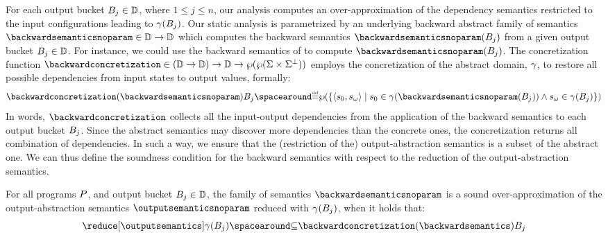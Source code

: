 For each output bucket ${B}_{j}\in\mathbb{D}$, where $1 \le j \le n$, our analysis computes an over-approximation of the dependency semantics restricted to the input configurations leading to $\gamma({B}_{j})$.
%
Our static analysis is parametrized by an underlying backward abstract family
of semantics $\backwardsemanticsnoparam\in\backwardtype$ which computes the backward semantics $\backwardsemanticsnoparam(\bucket)$ from a given output bucket ${B}_{j}\in\mathbb{D}$.
For instance, we could use the backward semantics of  to compute $\backwardsemanticsnoparam(\bucket)$.
The concretization function $\backwardconcretization\in(\backwardtype)\to\abstractdomain\to\outputtype$ employs the concretization of the abstract domain, \cf{} $\gamma$, to restore all possible dependencies from input states to output values, formally:
\[
  \backwardconcretization(\backwardsemanticsnoparam)\bucket \DefeQ
  \setof{\setdef{
    \inputoutputtuple{\defstate}
  }{
    \retrieveinput{\defstate}\in\abstractdomainconcretization(\backwardsemanticsnoparam(\bucket))\land\retrieveoutput{\defstate}\in\abstractdomainconcretization(\bucket)
    }
  }
  \]
In words, $\backwardconcretization$ collects all the input-output dependencies from the application of the backward semantics to each output bucket ${B}_{j}$.
Since the abstract semantics may discover more dependencies than the concrete ones, the concretization returns all combination of dependencies.
In such a way, we ensure that the (restriction of the) output-abstraction semantics is a subset of the abstract one.
%
We can thus define the soundness condition for the backward semantics with respect to the reduction of the output-abstraction semantics.


\begin{definition}
  For all programs $P$, and output bucket ${B}_{j}\in\mathbb{D}$, the family of semantics $\backwardsemanticsnoparam$ is a \textup{sound over-approximation} of the output-abstraction semantics $\outputsemanticsnoparam$ reduced with  $\gamma({B}_{j})$, when it holds that:
  \[\reducedoutputsemantics \SubseteQ \backwardconcretization(\backwardsemantics)\bucket\]
\end{definition}

